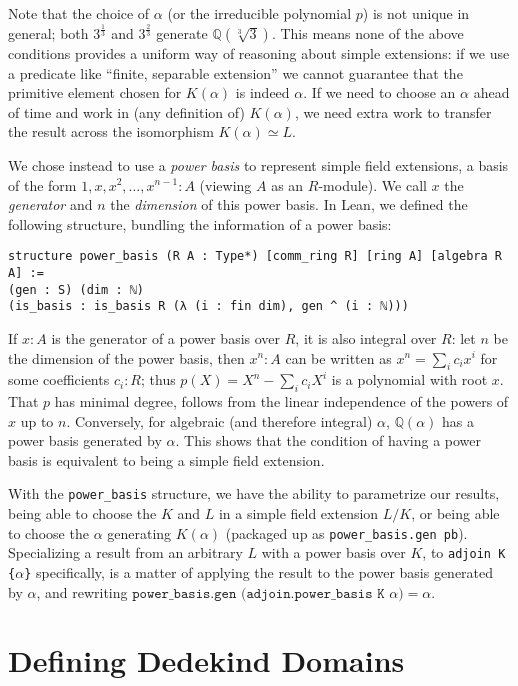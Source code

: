 \documentclass{lipics-v2021}
\newcommand{\lean}[1]{\texttt{#1}\xspace} %
\newcommand{\Q}{\mathbb{Q}}
\begin{document}
Note that the choice of $\alpha$ (or the irreducible polynomial $p$) is not unique in general; both $3^\frac{1}{3}$ and $3^\frac{2}{3}$ generate $\Q(\sqrt[3]{3})$.
This means none of the above conditions provides a uniform way of reasoning about simple extensions:
if we use a predicate like ``finite, separable extension'' we cannot guarantee that the primitive element chosen for $K(\alpha)$ is indeed $\alpha$.
If we need to choose an $\alpha$ ahead of time and work in (any definition of) $K(\alpha)$, we need extra work to transfer the result across the isomorphism $K(\alpha) \simeq L$.

We chose instead to use a \emph{power basis} to represent simple field extensions, a basis of the form $1, x, x^2, \dots, x^{n-1} : A$ (viewing $A$ as an $R$-module).
We call $x$ the \emph{generator} and $n$ the \emph{dimension} of this power basis.
In Lean, we defined the following structure, bundling the information of a power basis:
\begin{lstlisting}
structure power_basis (R A : Type*) [comm_ring R] [ring A] [algebra R A] :=
(gen : S) (dim : ℕ)
(is_basis : is_basis R (λ (i : fin dim), gen ^ (i : ℕ)))
\end{lstlisting}

If $x : A$ is the generator of a power basis over $R$, it is also integral over $R$:
let $n$ be the dimension of the power basis, then $x^n : A$ can be written as $x^n = \sum_i c_i x^i$ for some coefficients $c_i : R$;
thus $p(X) = X^n - \sum_i c_i X^i$ is a polynomial with root $x$.
That $p$ has minimal degree, follows from the linear independence of the powers of $x$ up to $n$.
Conversely, for algebraic (and therefore integral) $\alpha$, $\Q(\alpha)$ has a power basis generated by $\alpha$.
This shows that the condition of having a power basis is equivalent to being a simple field extension.

With the \lean{power\_basis} structure, we have the ability to parametrize our results,
being able to choose the $K$ and $L$ in a simple field extension $L / K$,
or being able to choose the $\alpha$ generating $K(\alpha)$ (packaged up as \lean{power\_basis.gen\ pb}).
Specializing a result from an arbitrary $L$ with a power basis over $K$, to \lean{adjoin K \{$\alpha$\}} specifically, is a matter of applying the result to the power basis generated by $\alpha$, and rewriting $\lean{power\_basis.gen (adjoin.power\_basis K $\alpha$)} = \alpha$.


\section{Defining Dedekind Domains}
\end{document}
